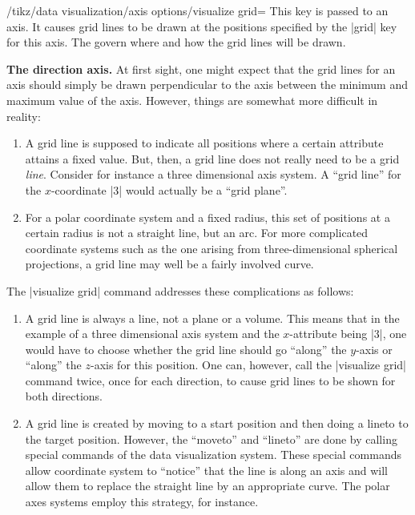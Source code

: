 \begin{key}{/tikz/data visualization/axis options/visualize grid=}
    This key is passed to an axis. It causes grid lines to be drawn at the
    positions specified by the |grid| key for this axis. The 
    govern where and how the grid lines will be drawn.


    \medskip
    \textbf{The direction axis.}
    At first sight, one might expect that the grid lines for an axis should
    simply be drawn perpendicular to the axis between the minimum and maximum
    value of the axis. However, things are somewhat more difficult in reality:
    \begin{enumerate}
        \item A grid line is supposed to indicate all positions where a certain
            attribute attains a fixed value. But, then, a grid line does not
            really need to be a grid \emph{line}. Consider for instance a three
            dimensional axis system. A ``grid line'' for the $x$-coordinate |3|
            would actually be a ``grid plane''.
        \item For a polar coordinate  system and a fixed radius, this set of
            positions at a certain radius is not a straight line, but an arc.
            For more complicated coordinate systems such as the one arising
            from three-dimensional spherical projections, a grid line may well
            be a fairly involved curve.
    \end{enumerate}
    The |visualize grid| command addresses these complications as follows:
    \begin{enumerate}
        \item A grid line is always a line, not a plane or a volume. This means
            that in the example of a three dimensional axis system and the
            $x$-attribute being |3|, one would have to choose whether the grid
            line should go ``along'' the $y$-axis or ``along'' the $z$-axis for
            this position. One can, however, call the |visualize grid| command
            twice, once for each direction, to cause grid lines to be shown for
            both directions.
        \item A grid line is created by moving to a start position and then
            doing a lineto to the target position. However, the ``moveto'' and
            ``lineto'' are done by calling special commands of the data
            visualization system. These special commands allow coordinate
            system to ``notice'' that the line is along an axis and will allow
            them to replace the straight line by an appropriate curve. The
            polar axes systems employ this strategy, for instance.
    \end{enumerate}


\end{key}

